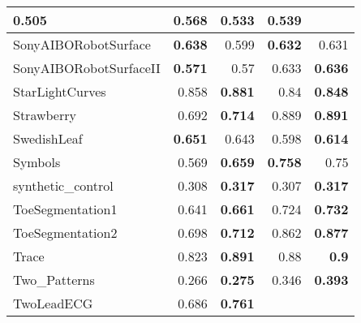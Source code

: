 \begin{longtable}{|l||r|r||r|r|}
0.505 &
\cellcolor[rgb]{ .973,  .796,  .678} \textbf{0.568} &
0.533 &
\cellcolor[rgb]{ .973,  .796,  .678} \textbf{0.539}
\bigstrut\\
\hline
SonyAIBORobotSurface &
\cellcolor[rgb]{ .973,  .796,  .678} \textbf{0.638} &
0.599 &
\cellcolor[rgb]{ .973,  .796,  .678} \textbf{0.632} &
0.631
\bigstrut\\
\hline
\rowcolor[rgb]{ .851,  .851,  .851} SonyAIBORobotSurfaceII &
\cellcolor[rgb]{ .973,  .796,  .678} \textbf{0.571} &
0.57 &
0.633 &
\cellcolor[rgb]{ .973,  .796,  .678} \textbf{0.636}
\bigstrut\\
\hline
StarLightCurves &
0.858 &
\cellcolor[rgb]{ .973,  .796,  .678} \textbf{0.881} &
0.84 &
\cellcolor[rgb]{ .973,  .796,  .678} \textbf{0.848}
\bigstrut\\
\hline
\rowcolor[rgb]{ .851,  .851,  .851} Strawberry &
0.692 &
\cellcolor[rgb]{ .973,  .796,  .678} \textbf{0.714} &
0.889 &
\cellcolor[rgb]{ .973,  .796,  .678} \textbf{0.891}
\bigstrut\\
\hline
SwedishLeaf &
\cellcolor[rgb]{ .973,  .796,  .678} \textbf{0.651} &
0.643 &
0.598 &
\cellcolor[rgb]{ .973,  .796,  .678} \textbf{0.614}
\bigstrut\\
\hline
\rowcolor[rgb]{ .851,  .851,  .851} Symbols &
0.569 &
\cellcolor[rgb]{ .973,  .796,  .678} \textbf{0.659} &
\cellcolor[rgb]{ .973,  .796,  .678} \textbf{0.758} &
0.75
\bigstrut\\
\hline
synthetic\_control &
0.308 &
\cellcolor[rgb]{ .973,  .796,  .678} \textbf{0.317} &
0.307 &
\cellcolor[rgb]{ .973,  .796,  .678} \textbf{0.317}
\bigstrut\\
\hline
\rowcolor[rgb]{ .851,  .851,  .851} ToeSegmentation1 &
0.641 &
\cellcolor[rgb]{ .973,  .796,  .678} \textbf{0.661} &
0.724 &
\cellcolor[rgb]{ .973,  .796,  .678} \textbf{0.732}
\bigstrut\\
\hline
ToeSegmentation2 &
0.698 &
\cellcolor[rgb]{ .973,  .796,  .678} \textbf{0.712} &
0.862 &
\cellcolor[rgb]{ .973,  .796,  .678} \textbf{0.877}
\bigstrut\\
\hline
\rowcolor[rgb]{ .851,  .851,  .851} Trace &
0.823 &
\cellcolor[rgb]{ .973,  .796,  .678} \textbf{0.891} &
0.88 &
\cellcolor[rgb]{ .973,  .796,  .678} \textbf{0.9}
\bigstrut\\
\hline
Two\_Patterns &
0.266 &
\cellcolor[rgb]{ .973,  .796,  .678} \textbf{0.275} &
0.346 &
\cellcolor[rgb]{ .973,  .796,  .678} \textbf{0.393}
\bigstrut\\
\hline
\rowcolor[rgb]{ .851,  .851,  .851} TwoLeadECG &
0.686 &
\cellcolor[rgb]{ .973,  .796,  .678} \textbf{0.761} &

\end{longtable}
